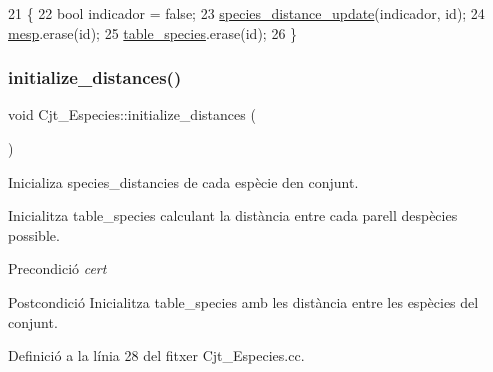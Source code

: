 \begin{DoxyCode}
21                                           \{
22     \textcolor{keywordtype}{bool} indicador = \textcolor{keyword}{false};
23     \hyperlink{class_cjt___especies_a043f6ce127ac78eb891f6d004eee40b0}{species\_distance\_update}(indicador, \textcolor{keywordtype}{id});
24     \hyperlink{class_cjt___especies_a64a525b38c78935e7432b362ea9a2306}{mesp}.erase(\textcolor{keywordtype}{id});
25     \hyperlink{class_cjt___especies_ae56d242080836b8d3db505f0a8623090}{table\_species}.erase(\textcolor{keywordtype}{id});
26 \}
\end{DoxyCode}
\mbox{\label{class_cjt___especies_ab041e83795b06d02ba7bad8422189361}} 
\subsubsection{\texorpdfstring{initialize\+\_\+distances()}{initialize\_distances()}}
{\footnotesize\ttfamily void Cjt\+\_\+\+Especies\+::initialize\+\_\+distances (\begin{DoxyParamCaption}{ }\end{DoxyParamCaption})}



Inicializa species\+\_\+distancies de cada espècie d\textquotesingle{}en conjunt. 

Inicialitza table\+\_\+species calculant la distància entre cada parell d\textquotesingle{}espècies possible.

\begin{DoxyPrecond}{Precondició}
{\itshape cert} 
\end{DoxyPrecond}
\begin{DoxyPostcond}{Postcondició}
Inicialitza table\+\_\+species amb les distància entre les espècies del conjunt. 
\end{DoxyPostcond}


Definició a la línia 28 del fitxer Cjt\+\_\+\+Especies.\+cc.


